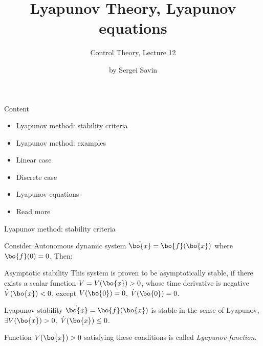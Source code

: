 \documentclass{beamer}
\title{Lyapunov Theory, Lyapunov equations}
\subtitle{Control Theory, Lecture 12}
\author{by Sergei Savin}
\date{\mydate}
\begin{document}
\maketitle


\begin{frame}{Content}

\begin{itemize}
\item Lyapunov method: stability criteria
\item Lyapunov method: examples
\item Linear case
\item Discrete case
\item Lyapunov equations
\item Read more
\end{itemize}

\end{frame}





\begin{frame}{Lyapunov method: stability criteria}
\begin{flushleft}

Consider Autonomous dynamic system $\dot{\bo{x}} = \bo{f}(\bo{x})$ where $ \bo{f}(0) = 0$. Then:

\begin{block}{Asymptotic stability}
This system is proven to be asymptotically stable, if there exists a scalar function $V = V(\bo{x}) > 0$, whose time derivative is negative $\dot V(\bo{x}) < 0$, except $V(\bo{0}) = 0$, $\dot V(\bo{0}) = 0$.
\end{block}

\begin{block}{Lyapunov stability}
$\dot{\bo{x}} = \bo{f}(\bo{x})$ is stable in the sense of Lyapunov, $\exists V(\bo{x}) > 0$, $\dot V(\bo{x}) \leq 0$.
\end{block}

\begin{definition}
Function $V(\bo{x}) > 0$ satisfying these conditions is called \emph{Lyapunov function}.
\end{definition}


\end{flushleft}
\end{frame}
\end{document}
